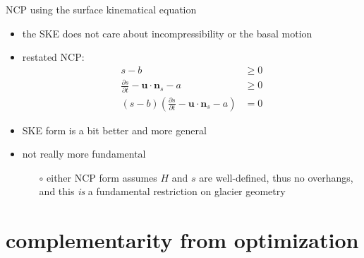 \documentclass[10pt,hyperref,dvipsnames]{beamer}
\newcommand{\bn}{\mathbf{n}}
\newcommand{\bu}{\mathbf{u}}
\begin{document}
\begin{frame}{NCP using the surface kinematical equation}

\begin{itemize}
\item the SKE does not care about incompressibility or the basal motion
\item restated NCP:
\begin{align*}
s-b &\ge 0 \\
\frac{\partial s}{\partial t} - \bu \cdot \bn_s - a &\ge 0 \\
(s-b) \left(\frac{\partial s}{\partial t} - \bu \cdot \bn_s - a\right) &= 0
\end{align*}

\medskip
\item SKE form is a bit better and more general
\item not really more fundamental
    \begin{itemize}
    \item[$\circ$] either NCP form assumes $H$ and $s$ are well-defined, thus no overhangs, and this \emph{is} a fundamental restriction on glacier geometry
    \end{itemize}
\end{itemize}
\end{frame}


\section{complementarity from optimization}

\newcommand{\blambda}{\bm{\lambda}}
\end{document}
